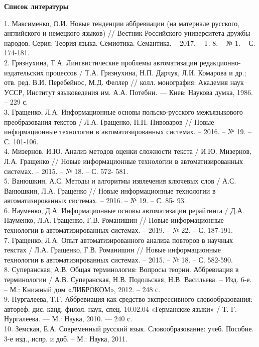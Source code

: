\documentclass{article}
\begin{document}
\begin{center}
\textbf{Список литературы}
\end{center}
1. Максименко, О.И. Новые тенденции аббревиации (на материале
русского, английского и немецкого языков) // Вестник Российского
университета дружбы народов. Серия: Теория языка. Семиотика.
Семантика. – 2017. – Т. 8. – № 1. – С. 174-181.\\
2. Грязнухина, Т.А. Лингвистические проблемы автоматизации
редакционно-издательских процессов / Т.А. Грязнухина, Н.П. Дарчук,
Л.И. Комарова и др.; отв. ред. В.И. Перебейнос, М.Д. Феллер // колл.
монография: Академия наук УССР, Институт языковедения им.
А.А. Потебни. — Киев: Наукова думка, 1986. – 229 с.\\
3. Гращенко, Л.А. Информационные основы польско-русского
межъязыкового преобразования текстов / Л.А. Гращенко,
Н.Н. Пивоваров // Новые информационные технологии в
автоматизированных системах. – 2016. – № 19. – С. 101-106.\\
4. Мизернов, И.Ю. Анализ методов оценки сложности текста /
И.Ю. Мизернов, Л.А. Гращенко // Новые информационные
технологии в автоматизированных системах. – 2015. – № 18. – С. 572-
581.\\
5. Ванюшкин, А.С. Методы и алгоритмы извлечения ключевых слов /
А.С. Ванюшкин, Л.А. Гращенко // Новые информационные
технологии в автоматизированных системах. – 2016. – № 19. – С. 85-
93.\\
6. Науменко, Д.А. Информационные основы автоматизации
рерайтинга / Д.А. Науменко, Л.А. Гращенко, Г.В. Романишин //
Новые информационные технологии в автоматизированных системах.
– 2019. – № 22. – С. 187-191.\\
7. Гращенко, Л.А. Опыт автоматизированного анализа повторов в
научных текстах / Л.А. Гращенко, Г.В. Романишин // Новые
информационные технологии в автоматизированных системах. –
2015. – № 18. – С. 582-590.\\
8. Суперанская, А.В. Общая терминология: Вопросы теории.
Аббревиация в терминологии / А.В. Суперанская, Н.В. Подольская,
Н.В. Васильева. – Изд. 6-е. – М.: Книжный дом «ЛИБРОКОМ», 2012.
– 248 с.\\
9. Нургалеева, Т.Г. Аббревиация как средство экспрессивного
словообразования: автореф. дис. канд. филол. наук, спец. 10.02.04
«Германские языки» / Т. Г. Нургалеева. — М.: Наука, 2010. — 240 с.\\
10. Земская, Е.А. Современный русский язык. Словообразование:
учеб. Пособие. 3-е изд., испр. и доб. – М.: Наука, 2011.\\
\end{document}
